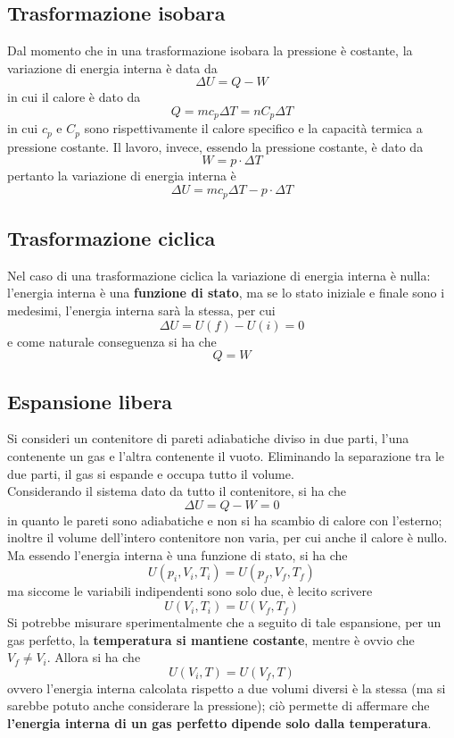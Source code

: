 \documentclass[a4paper]{extarticle}
\begin{document}
\vspace{1em}
\subsection{Trasformazione isobara}
Dal momento che in una trasformazione isobara la pressione è costante, la variazione di energia interna è data da
\[\Delta U = Q - W\]
in cui il calore è dato da
\[Q=m c_p \Delta T = n C_p \Delta T\]
in cui $c_p$ e $C_p$ sono rispettivamente il calore specifico e la capacità termica a pressione costante. Il lavoro, invece, essendo la pressione costante, è dato da
\[W=p \cdot \Delta T\]
pertanto la variazione di energia interna è
\[\Delta U = m c_p \Delta T - p \cdot \Delta T\]

\vspace{1em}
\subsection{Trasformazione ciclica}
Nel caso di una trasformazione ciclica la variazione di energia interna è nulla: l'energia interna è una \textbf{funzione di stato}, ma se lo stato iniziale e finale sono i medesimi, l'energia interna sarà la stessa, per cui
\[\Delta U = U(f) - U(i) = 0\]
e come naturale conseguenza si ha che
\[\boxed{Q=W}\]

\vspace{1em}
\subsection{Espansione libera}
Si consideri un contenitore di pareti adiabatiche diviso in due parti, l'una contenente un gas e l'altra contenente il vuoto. Eliminando la separazione tra le due parti, il gas si espande e occupa tutto il volume.\\
Considerando il sistema dato da tutto il contenitore, si ha che
\[\Delta U = Q - W = 0\]
in quanto le pareti sono adiabatiche e non si ha scambio di calore con l'esterno; inoltre il volume dell'intero contenitore non varia, per cui anche il calore è nullo.\\
Ma essendo l'energia interna è una funzione di stato, si ha che
\[U(p_i,V_i,T_i) = U(p_f,V_f,T_f)\]
ma siccome le variabili indipendenti sono solo due, è lecito scrivere
\[U(V_i,T_i) = U(V_f,T_f)\]
Si potrebbe misurare sperimentalmente che a seguito di tale espansione, per un gas perfetto, la \textbf{temperatura si mantiene costante}, mentre è ovvio che $V_f \neq V_i$. Allora si ha che
\[U(V_i,T) = U(V_f,T)\]
ovvero l'energia interna calcolata rispetto a due volumi diversi è la stessa (ma si sarebbe potuto anche considerare la pressione); ciò permette di affermare che \textbf{l'energia interna di un gas perfetto dipende solo dalla temperatura}.\\
\end{document}
